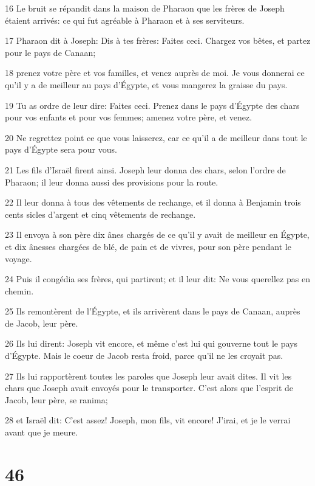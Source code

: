 \par 16 Le bruit se répandit dans la maison de Pharaon que les frères de Joseph étaient arrivés: ce qui fut agréable à Pharaon et à ses serviteurs.
\par 17 Pharaon dit à Joseph: Dis à tes frères: Faites ceci. Chargez vos bêtes, et partez pour le pays de Canaan;
\par 18 prenez votre père et vos familles, et venez auprès de moi. Je vous donnerai ce qu'il y a de meilleur au pays d'Égypte, et vous mangerez la graisse du pays.
\par 19 Tu as ordre de leur dire: Faites ceci. Prenez dans le pays d'Égypte des chars pour vos enfants et pour vos femmes; amenez votre père, et venez.
\par 20 Ne regrettez point ce que vous laisserez, car ce qu'il a de meilleur dans tout le pays d'Égypte sera pour vous.
\par 21 Les fils d'Israël firent ainsi. Joseph leur donna des chars, selon l'ordre de Pharaon; il leur donna aussi des provisions pour la route.
\par 22 Il leur donna à tous des vêtements de rechange, et il donna à Benjamin trois cents sicles d'argent et cinq vêtements de rechange.
\par 23 Il envoya à son père dix ânes chargés de ce qu'il y avait de meilleur en Égypte, et dix ânesses chargées de blé, de pain et de vivres, pour son père pendant le voyage.
\par 24 Puis il congédia ses frères, qui partirent; et il leur dit: Ne vous querellez pas en chemin.
\par 25 Ils remontèrent de l'Égypte, et ils arrivèrent dans le pays de Canaan, auprès de Jacob, leur père.
\par 26 Ils lui dirent: Joseph vit encore, et même c'est lui qui gouverne tout le pays d'Égypte. Mais le coeur de Jacob resta froid, parce qu'il ne les croyait pas.
\par 27 Ils lui rapportèrent toutes les paroles que Joseph leur avait dites. Il vit les chars que Joseph avait envoyés pour le transporter. C'est alors que l'esprit de Jacob, leur père, se ranima;
\par 28 et Israël dit: C'est assez! Joseph, mon fils, vit encore! J'irai, et je le verrai avant que je meure.

\chapter{46}


